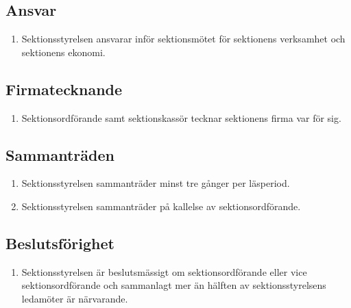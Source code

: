 \documentclass[11pt,a4paper]{article}
\begin{document}
\subsection{Ansvar}

\begin{enumerate}[\thesubsection .1]

  \item Sektionsstyrelsen ansvarar inför sektionsmötet för sektionens verksamhet och sektionens ekonomi.

\end{enumerate}

\subsection{Firmatecknande}

\begin{enumerate}[\thesubsection .1]

  \item Sektionsordförande samt sektionskassör tecknar sektionens
  firma var för sig.

\end{enumerate}

\subsection{Sammanträden}

\begin{enumerate}[\thesubsection .1]

  \item  Sektionsstyrelsen sammanträder minst tre gånger per läsperiod.

  \item Sektionsstyrelsen sammanträder på kallelse av sektionsordförande.

\end{enumerate}

\subsection{Beslutsförighet}

\begin{enumerate}[\thesubsection .1]

  \item  Sektionsstyrelsen är beslutsmässigt om sektionsordförande eller vice sektionsordförande och sammanlagt mer än hälften av sektionsstyrelsens ledamöter är närvarande.

\end{enumerate}
\end{document}

